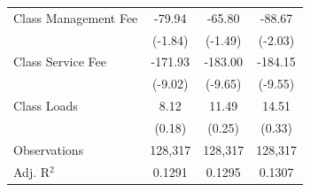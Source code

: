 {\begin{tabular}{l*{3}{c}}
\addlinespace
Class Management Fee&      -79.94\sym{*}  &      -65.80         &      -88.67\sym{**} \\
                    &     (-1.84)         &     (-1.49)         &     (-2.03)         \\
\addlinespace
Class Service Fee   &     -171.93\sym{***}&     -183.00\sym{***}&     -184.15\sym{***}\\
                    &     (-9.02)         &     (-9.65)         &     (-9.55)         \\
\addlinespace
Class Loads         &        8.12         &       11.49         &       14.51         \\
                    &      (0.18)         &      (0.25)         &      (0.33)         \\
\midrule
Observations        &     128,317         &     128,317         &     128,317         \\
Adj. R$^{2}$        &      0.1291         &      0.1295         &      0.1307         \\
\bottomrule
\end{tabular}
}
